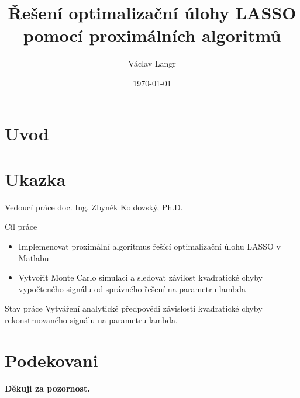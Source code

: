 


\title{Řešení optimalizační úlohy LASSO pomocí proximálních algoritmů}
%
\author{Václav Langr}
% 
\date{\today} %
\newcommand{\TextTitulniStranaPodLinkou}{\tiny
Studentská 2 {\color{FM_TUL} |} 461\,17 Liberec 2 {\color{FM_TUL} |} 
{vaclav.langr@tul.cz} {\color{FM_TUL} |} 
\href{http://www.fm.tul.cz/}{www.fm.tul.cz}}
 
\section{Uvod}
\begin{frame}[plain]
\titlepage
\end{frame}
\section{Ukazka}
\begin{frame}
  \begin{block}{Vedoucí práce}
    doc. Ing. Zbyněk Koldovský, Ph.D.
  \end{block}
	\begin{block}{Cíl práce}
    \begin{itemize}
        \item Implemenovat proximální algoritmus řešící optimalizační úlohu LASSO v Matlabu
        \item Vytvořit Monte Carlo simulaci a sledovat závilost kvadratické chyby vypočteného signálu od správného řešení na parametru lambda
      \end{itemize}
  \end{block}
	\begin{block}{Stav práce}
    Vytváření analytické předpovědi závislosti kvadratické chyby rekonstruovaného signálu na parametru lambda.
  \end{block}
\end{frame}
\section{Podekovani}
\begin{frame}
  \begin{center}
  {\Large \bfseries
    Děkuji za pozornost.
    } 
  \end{center}
\end{frame}

